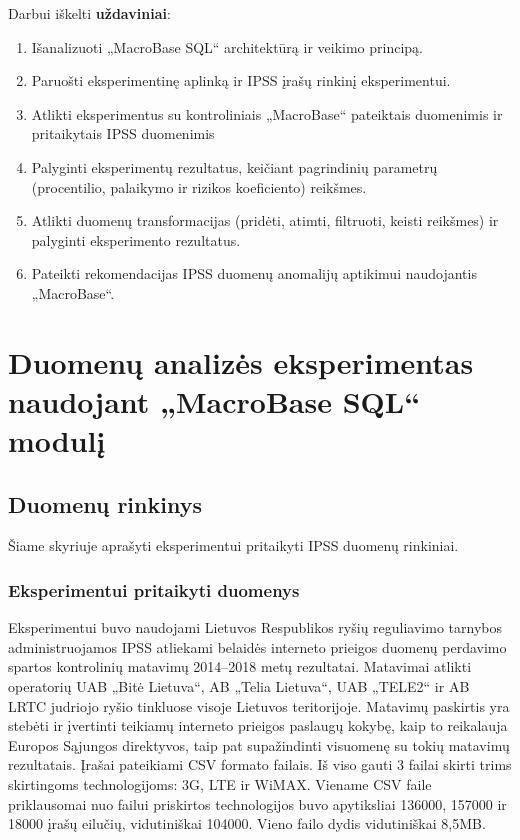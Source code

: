 \documentclass{VUMIFPSbakalaurinis}
\begin{document}
Darbui iškelti \textbf{uždaviniai}:
\begin{enumerate}
	\item Išanalizuoti „MacroBase SQL“ architektūrą ir veikimo principą.
	\item Paruošti eksperimentinę aplinką ir IPSS įrašų rinkinį eksperimentui.
	\item Atlikti eksperimentus su kontroliniais „MacroBase“ pateiktais duomenimis ir pritaikytais IPSS duomenimis	
	\item Palyginti eksperimentų rezultatus, keičiant pagrindinių parametrų (procentilio, palaikymo ir rizikos koeficiento) reikšmes.
	\item Atlikti duomenų transformacijas (pridėti, atimti, filtruoti, keisti reikšmes) ir palyginti eksperimento rezultatus.
	\item Pateikti rekomendacijas IPSS duomenų anomalijų aptikimui naudojantis „MacroBase“.
\end{enumerate}



\section{Duomenų analizės eksperimentas naudojant „MacroBase SQL“ modulį}

\subsection{Duomenų rinkinys}
Šiame skyriuje aprašyti eksperimentui pritaikyti IPSS duomenų rinkiniai.

\subsubsection{Eksperimentui pritaikyti duomenys}
Eksperimentui buvo naudojami Lietuvos Respublikos ryšių reguliavimo tarnybos administruojamos IPSS atliekami belaidės interneto prieigos duomenų perdavimo spartos kontrolinių matavimų 2014–2018 metų rezultatai. Matavimai atlikti operatorių UAB „Bitė Lietuva“, AB „Telia Lietuva“, UAB „TELE2“ ir AB LRTC judriojo ryšio tinkluose visoje Lietuvos teritorijoje. Matavimų paskirtis yra stebėti ir įvertinti teikiamų interneto prieigos paslaugų kokybę, kaip to reikalauja Europos Sąjungos direktyvos, taip pat supažindinti visuomenę su tokių matavimų rezultatais. Įrašai pateikiami CSV formato failais. Iš viso gauti 3 failai skirti trims skirtingoms technologijoms: 3G, LTE ir WiMAX. Viename CSV faile priklausomai nuo failui priskirtos technologijos buvo apytiksliai 136000, 157000 ir 18000 įrašų eilučių, vidutiniškai 104000. Vieno failo dydis vidutiniškai 8,5MB.
\end{document}
